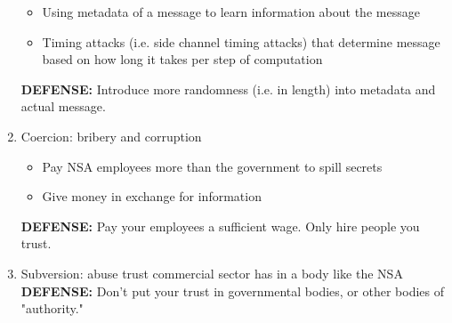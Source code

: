 \documentclass[11pt]{article}
\begin{document}
\begin{enumerate}
\begin{itemize}
	\item Using metadata of a message to learn information about the message
	\item Timing attacks (i.e. side channel timing attacks) that determine message based on how long it takes per step of computation
	\end{itemize}
	\textbf{DEFENSE: } Introduce more randomness (i.e. in length) into metadata and actual message.
\item Coercion: bribery and corruption
	\begin{itemize}
	\item Pay NSA employees more than the government to spill secrets
	\item Give money in exchange for information
	\end{itemize}
	\textbf{DEFENSE: } Pay your employees a sufficient wage. Only hire people you trust.
\item Subversion: abuse trust commercial sector has in a body like the NSA
\textbf{DEFENSE: } Don't put your trust in governmental bodies, or other bodies of "authority."

\end{enumerate}
\end{document}
